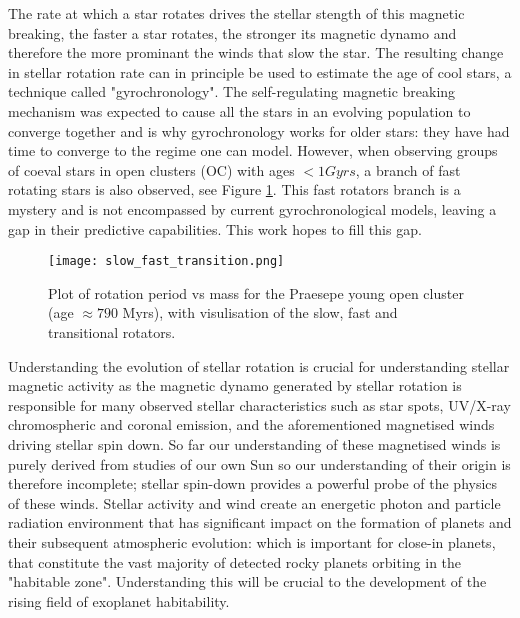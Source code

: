 \documentclass[fleqn,usenatbib]{mnras}
\begin{document}
The rate at which a star rotates drives the stellar stength of this magnetic breaking, the faster a star rotates, the stronger its magnetic dynamo and therefore the more prominant the winds that slow the star.
The resulting change in stellar rotation rate can in principle be used to estimate the age of cool stars, a technique called "gyrochronology".
The self-regulating magnetic breaking mechanism was expected to cause all the stars in an evolving population to converge together and is why gyrochronology works for older stars: they have had time to converge to the regime one can model.
However, when observing groups of coeval stars in open clusters (OC) with ages $< 1Gyrs$, a branch of fast rotating stars is also observed, see Figure \ref{fig:slow_fast_transition}.
This fast rotators branch is a mystery and is not encompassed by current gyrochronological models, leaving a gap in their predictive capabilities.
This work hopes to fill this gap.


\begin{figure}
	\texttt{[image: slow\_fast\_transition.png]}
	\caption[]{Plot of rotation period vs mass for the Praesepe young open cluster (age $\approx 790$ Myrs), with visulisation of the slow, fast and transitional rotators.}
	\label{fig:slow_fast_transition}
\end{figure}

Understanding the evolution of stellar rotation is crucial for understanding stellar magnetic activity as the magnetic dynamo generated by stellar rotation is responsible for many observed stellar characteristics such as star spots, UV/X-ray chromospheric and coronal emission, and the aforementioned magnetised winds driving stellar spin down.
So far our understanding of these magnetised winds is purely derived from studies of our own Sun so our understanding of their origin is therefore incomplete; stellar spin-down provides a powerful probe of the physics of these winds.
Stellar activity and wind create an energetic photon and particle radiation environment that has significant impact on the formation of planets and their subsequent atmospheric evolution: which is important for close-in planets, that constitute the vast majority of detected rocky planets orbiting in the "habitable zone".
Understanding this will be crucial to the development of the rising field of exoplanet habitability.
\end{document}
